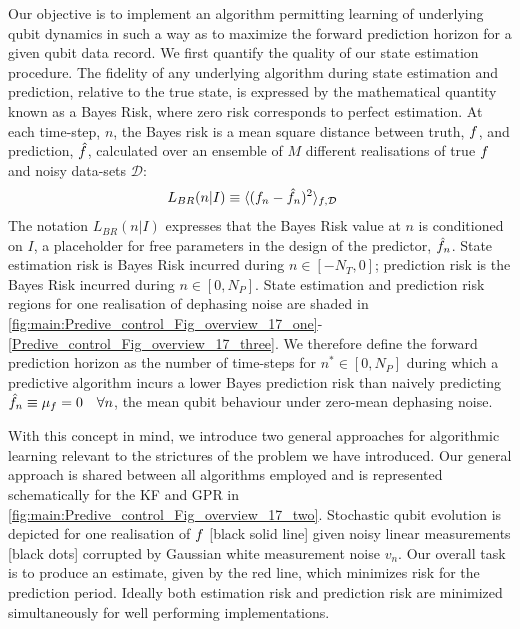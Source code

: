 Our objective is to implement an algorithm permitting learning of underlying qubit dynamics in such a way as to maximize the forward prediction horizon for a given qubit data record.  We first quantify the quality of our state estimation procedure.  The fidelity of any underlying algorithm during state estimation and prediction, relative to the true state, is expressed by the mathematical quantity known as a Bayes Risk, where zero risk corresponds to perfect estimation. At each time-step, $n$, the Bayes risk is a mean square distance between truth, $f$, and prediction, $\hat{f}$, calculated over an ensemble of $M$ different realisations of true $f$ and noisy data-sets $\mathcal{D}$:
\begin{align}
	L_{BR}(n | I) & \equiv \langle(f_n - \hat{f}_n)^2 \rangle_{f,\mathcal{D}} \label{eqn:main:sec:ap_opt_LossBR}
\end{align}
The notation $L_{BR}(n | I)$ expresses that the Bayes Risk value at $n$ is conditioned on $I$, a placeholder for free parameters in the design of the predictor, $\hat{f}_n$. State estimation risk is Bayes Risk incurred during $n \in [-N_T, 0]$; prediction risk is the Bayes Risk incurred during $n \in [0, N_P]$. State estimation and prediction risk regions for one realisation of dephasing noise are shaded in \cref{fig:main:Predive_control_Fig_overview_17_one}-\ref{Predive_control_Fig_overview_17_three}.  We therefore define the forward prediction horizon as the number of time-steps for $ n^{*} \in [0, N_P]$ during which a predictive algorithm incurs a lower Bayes prediction risk than naively predicting $\hat{f}_n \equiv \mu_f = 0 \quad \forall n$, the mean qubit behaviour under zero-mean dephasing noise. 

With this concept in mind, we introduce two general approaches for algorithmic learning relevant to the strictures of the problem we have introduced.  Our general approach is shared between all algorithms employed and is represented schematically for the KF and GPR in \cref{fig:main:Predive_control_Fig_overview_17_two}. Stochastic qubit evolution is depicted for one realisation of $f$ [black solid line] given noisy linear measurements [black dots] corrupted by Gaussian white measurement noise $v_n$.  Our overall task is to produce an estimate, given by the red line, which minimizes risk for the prediction period.  Ideally both estimation risk and prediction risk are minimized simultaneously for well performing implementations.

